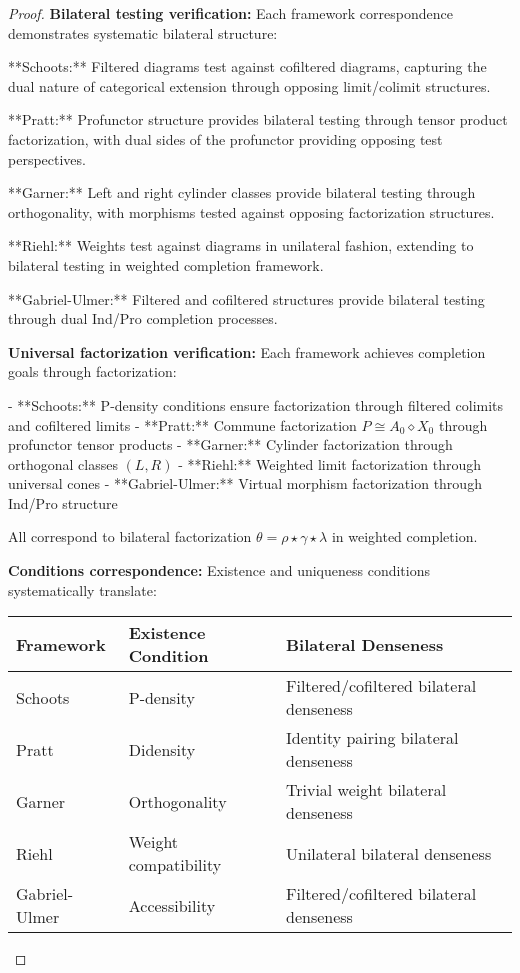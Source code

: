 \documentclass[11pt]{article}
\theoremstyle{plain}
\theoremstyle{definition}
\theoremstyle{remark}
\begin{document}
\begin{proof}
\textbf{Bilateral testing verification:} Each framework correspondence demonstrates systematic bilateral structure:

**Schoots:** Filtered diagrams test against cofiltered diagrams, capturing the dual nature of categorical extension through opposing limit/colimit structures.

**Pratt:** Profunctor structure provides bilateral testing through tensor product factorization, with dual sides of the profunctor providing opposing test perspectives.

**Garner:** Left and right cylinder classes provide bilateral testing through orthogonality, with morphisms tested against opposing factorization structures.

**Riehl:** Weights test against diagrams in unilateral fashion, extending to bilateral testing in weighted completion framework.

**Gabriel-Ulmer:** Filtered and cofiltered structures provide bilateral testing through dual Ind/Pro completion processes.

\textbf{Universal factorization verification:} Each framework achieves completion goals through factorization:

- **Schoots:** P-density conditions ensure factorization through filtered colimits and cofiltered limits
- **Pratt:** Commune factorization $P \cong A_0 \diamond X_0$ through profunctor tensor products
- **Garner:** Cylinder factorization through orthogonal classes $(L, R)$
- **Riehl:** Weighted limit factorization through universal cones
- **Gabriel-Ulmer:** Virtual morphism factorization through Ind/Pro structure

All correspond to bilateral factorization $\theta = \rho \star \gamma \star \lambda$ in weighted completion.

\textbf{Conditions correspondence:} Existence and uniqueness conditions systematically translate:

\begin{center}
\begin{tabular}{|l|l|l|}
\hline
\textbf{Framework} & \textbf{Existence Condition} & \textbf{Bilateral Denseness} \\
\hline
Schoots & P-density & Filtered/cofiltered bilateral denseness \\
Pratt & Didensity & Identity pairing bilateral denseness \\
Garner & Orthogonality & Trivial weight bilateral denseness \\
Riehl & Weight compatibility & Unilateral bilateral denseness \\
Gabriel-Ulmer & Accessibility & Filtered/cofiltered bilateral denseness \\
\hline
\end{tabular}
\end{center}


\end{proof}
\end{document}
